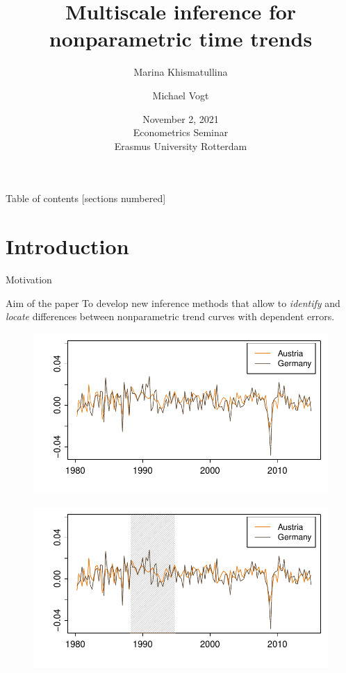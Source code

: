\documentclass[10pt]{beamer}
\title{Multiscale inference for nonparametric time trends}
\date{November 2, 2021\\ Econometrics Seminar \\ Erasmus University Rotterdam}
\author{Marina Khismatullina \and Michael Vogt}
\begin{document}
\maketitle

\begin{frame}{Table of contents}
  [sections numbered]
  \tableofcontents[hideallsubsections]
\end{frame}

\section{Introduction}


\begin{frame}{Motivation}

{ \begin{block}{Aim of the paper}
	To develop new inference methods that allow to \textit{identify} and \textit{locate} differences between nonparametric trend curves with dependent errors.
\end{block}}
	{\begin{figure}
    		\centering
    		\includegraphics[height=0.45\textheight]{plots/gdp_AUT_DEU.pdf}
  	\end{figure}}
	{\onslide<3>
	\vspace{-46,81mm}
	\begin{figure}
    		\centering
    		\includegraphics[height=0.45\textheight]{plots/gdp_AUT_DEU_1.pdf}

\end{figure}}
\end{frame}
\end{document}
